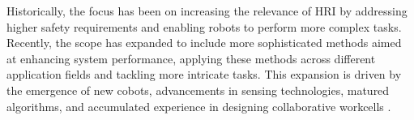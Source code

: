 Historically, the focus has been on increasing the relevance of {HRI} by addressing higher safety requirements and enabling 
robots to perform more complex tasks. Recently, the scope has expanded to include more sophisticated methods aimed at enhancing system performance, 
applying these methods across different application fields and tackling more intricate tasks. This expansion is driven by the emergence of new 
cobots, advancements in sensing technologies, matured algorithms, and accumulated experience in designing collaborative workcells \cite{robotics8040100}.







